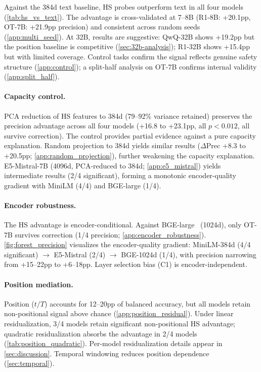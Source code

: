 Against the 384d text baseline, HS probes outperform text in all four models (\cref{tab:hs_vs_text}). The advantage is cross-validated at 7--8B (R1-8B: +20.1pp, OT-7B: +21.9pp precision) and consistent across random seeds (\cref{app:multi_seed}). At 32B, results are suggestive: QwQ-32B shows +19.2pp but the position baseline is competitive (\cref{sec:32b-analysis}); R1-32B shows +15.4pp but with limited coverage. Control tasks confirm the signal reflects genuine safety structure (\cref{app:control}); a split-half analysis on OT-7B confirms internal validity (\cref{app:split_half}).

\paragraph{Capacity control.} PCA reduction of HS features to 384d (79--92\% variance retained) preserves the precision advantage across all four models (+16.8 to +23.1pp, all $p{<}0.012$, all survive correction). The control provides partial evidence against a pure capacity explanation. Random projection to 384d yields similar results ($\Delta$Prec +8.3 to +20.5pp; \cref{app:random_projection}), further weakening the capacity explanation. E5-Mistral-7B (4096d, PCA-reduced to 384d; \cref{app:e5_mistral}) yields intermediate results (2/4 significant), forming a monotonic encoder-quality gradient with MiniLM (4/4) and BGE-large (1/4).

\paragraph{Encoder robustness.} The HS advantage is encoder-conditional. Against BGE-large~\citep{xiao2023cpack} (1024d), only OT-7B survives correction (1/4 precision; \cref{app:encoder_robustness}). \cref{fig:forest_precision} visualizes the encoder-quality gradient: MiniLM-384d (4/4 significant) $\to$ E5-Mistral (2/4) $\to$ BGE-1024d (1/4), with precision narrowing from +15--22pp to +6--18pp. Layer selection bias (C1) is encoder-independent.

\paragraph{Position mediation.} Position ($t/T$) accounts for 12--20pp of balanced accuracy, but all models retain non-positional signal above chance (\cref{app:position_residual}). Under linear residualization, 3/4 models retain significant non-positional HS advantage; quadratic residualization absorbs the advantage in 2/4 models (\cref{tab:position_quadratic}). Per-model residualization details appear in \cref{sec:discussion}. Temporal windowing reduces position dependence (\cref{sec:temporal}).


